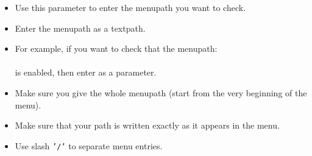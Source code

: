 \begin{itemize}
\item Use this parameter to enter the menupath you want to check. 
\item Enter the menupath as a textpath.
\item For example, if you want to check that the menupath:\\
\\
is enabled, then enter  as a parameter.
\item Make sure you give the whole menupath (start from the very beginning of the menu).
\item Make sure that your path is written exactly as it appears in the menu. 
\item Use slash {\tt '/'} to separate menu entries.
\end{itemize}

